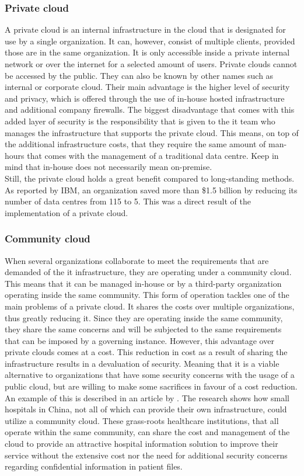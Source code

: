 \subsubsection{Private cloud}
A private cloud is an internal infrastructure in the cloud that is designated for use by a single organization. It can, however, consist of multiple clients, provided those are in the same organization. It is only accessible inside a private internal network or over the internet for a selected amount of users. Private clouds cannot be accessed by the public. They can also be known by other names such as internal or corporate cloud. Their main advantage is the higher level of security and privacy, which is offered through the use of in-house hosted infrastructure and additional company firewalls. The biggest disadvantage that comes with this added layer of security is the responsibility that is given to the \acrshort{it} team who manages the infrastructure that supports the private cloud. This means, on top of the additional infrastructure costs, that they require the same amount of man-hours that comes with the management of a traditional data centre. Keep in mind that in-house does not necessarily mean on-premise.
\\
Still, the private cloud holds a great benefit compared to long-standing methods. As reported by IBM, an organization saved more than \$1.5 billion by reducing its number of data centres from 115 to 5. This was a direct result of the implementation of a private cloud.\autocite{Hofmann2010} 


\subsubsection{Community cloud}
When several organizations collaborate to meet the requirements that are demanded of the \acrshort{it} infrastructure, they are operating under a community cloud. This means that it can be managed in-house or by a third-party organization operating inside the same community. This form of operation tackles one of the main problems of a private cloud. It shares the costs over multiple organizations, thus greatly reducing it. Since they are operating inside the same community, they share the same concerns and will be subjected to the same requirements that can be imposed by a governing instance. 
However, this advantage over private clouds comes at a cost. This reduction in cost as a result of sharing the infrastructure results in a devaluation of security. Meaning that it is a viable alternative to organizations that have some security concerns with the usage of a public cloud, but are willing to make some sacrifices in favour of a cost reduction. 
\\
An example of this is described in an article by \textcite{Yao2014}. The research shows how small hospitals in China, not all of which can provide their own infrastructure, could utilize a community cloud. These grass-roots healthcare institutions, that all operate within the same community, can share the cost and management of the cloud to provide an attractive hospital information solution to improve their service without the extensive cost nor the need for additional security concerns regarding confidential information in patient files.

